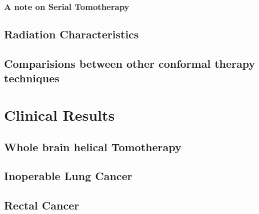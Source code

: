 \documentclass[12pt,journal,compsoc]{IEEEtran} %
\begin{document}
  \subsubsection{A note on Serial Tomotherapy}
  \subsection{Radiation Characteristics}
  \subsection{Comparisions between other conformal therapy techniques}
  \section{Clinical Results}
  \subsection{Whole brain helical Tomotherapy}
  \subsection{Inoperable Lung Cancer}
  \subsection{Rectal Cancer}
  
  {}
  
  
\end{document}
